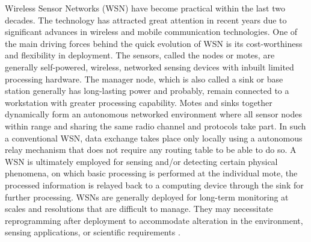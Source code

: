 \documentclass[conference,final]{IEEEtran}
\newcommand{\dme}[2]{\pdfmarkupcomment[markup=Highlight,color=yellow]{#1}{#2}}
\begin{document}
Wireless Sensor Networks (WSN) have become practical within the last two decades. %
The technology has attracted great attention in recent years due to significant advances in wireless and mobile communication technologies. 
One of the main driving forces behind the quick evolution of WSN is its cost-worthiness and flexibility in deployment.
The sensors, called the nodes or motes, are generally self-powered, wireless, networked sensing devices with inbuilt limited processing hardware.    
The manager node, which is also called a sink or base station generally has long-lasting power and probably, remain connected to a workstation with greater processing capability. 
Motes and sinks together dynamically form an autonomous networked environment where all sensor nodes within range and sharing the same radio channel and protocols take part.
In such a conventional WSN, data exchange takes place only locally using a autonomous relay mechanism that does not require any routing table to be able to do so. 
A WSN is ultimately employed for sensing and/or detecting certain physical phenomena, on which basic processing is performed at the individual mote, the processed information is relayed back to a computing device  through the sink for further processing.
WSNs are generally deployed for long-term monitoring at scales and resolutions that are difficult to manage. 
They may necessitate reprogramming after deployment to accommodate alteration in the environment, sensing applications, or scientific requirements \cite{ISI:000253439700120}.
\end{document}
